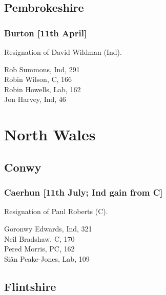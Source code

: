 \documentclass[a4paper,openany,10pt]{book}
\begin{document}
\subsection*{Pembrokeshire}

\subsubsection*{Burton \hspace*{\fill}\nolinebreak[1]%
\enspace\hspace*{\fill}
[11th April]}


Resignation of David Wildman (Ind).



Rob Summons, Ind, 291\\
Robin Wilson, C, 166\\
Robin Howells, Lab, 162\\
Jon Harvey, Ind, 46\\




\section{North Wales}

\subsection*{Conwy}

\subsubsection*{Caerhun \hspace*{\fill}\nolinebreak[1]%
\enspace\hspace*{\fill}
[11th July; Ind gain from C]}


Resignation of Paul Roberts (C).



Goronwy Edwards, Ind, 321\\
Neil Bradshaw, C, 170\\
Pered Morris, PC, 162\\
Si\^an Peake-Jones, Lab, 109\\


\subsection*{Flintshire}
\end{document}
